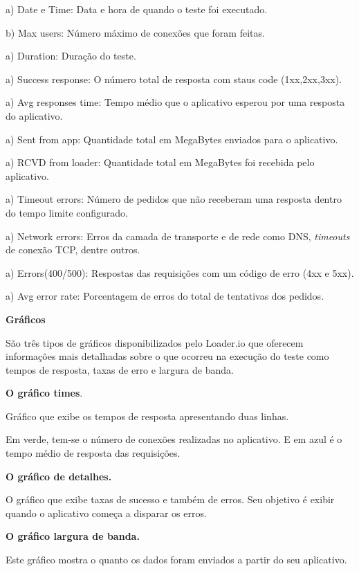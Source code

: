   \begin{compactitem}
    \item[a)] Date e Time: Data e hora de quando o teste foi executado.
    \item[b)] Max users: Número máximo de conexões que foram feitas.
    \item[a)] Duration:  Duração do teste.
    \item[a)] Success response: O número total de resposta com staus code (1xx,2xx,3xx).
    \item[a)] Avg responses time: Tempo médio que o aplicativo esperou por uma resposta do aplicativo.
    \item[a)] Sent from app: Quantidade total em MegaBytes enviados para o aplicativo.
    \item[a)] RCVD from loader: Quantidade total em MegaBytes foi recebida pelo aplicativo.
    \item[a)] Timeout errors: Número de pedidos que não receberam uma resposta dentro do tempo limite configurado.
    \item[a)] Network errors: Erros da camada de transporte e de rede como \ac{DNS}, \textit{timeouts} de conexão TCP, dentre outros.
    \item[a)] Errors(400/500): Respostas das requisições com um código de erro (4xx e 5xx).
    \item[a)] Avg error rate: Porcentagem de erros do total de tentativas dos pedidos.
  \end{compactitem}

  \textbf{Gráficos}
  
  São três tipos de gráficos disponibilizados pelo Loader.io que oferecem informações mais detalhadas 
  sobre o que ocorreu na execução do teste como tempos de resposta, taxas de erro e largura de banda.
  
  \textbf{O gráfico times}.
  
  Gráfico que exibe os tempos de resposta apresentando duas linhas.
  
  Em verde, tem-se o número de conexões realizadas no aplicativo. E em azul é o tempo médio de resposta das
  requisições.
  
  \textbf{O gráfico de detalhes.}
  
  O gráfico que exibe taxas de sucesso e também de erros. Seu objetivo é exibir quando o aplicativo
  começa a disparar os erros.
  
  \textbf{O gráfico largura de banda.}
  
  Este gráfico mostra o quanto os dados foram enviados a partir do seu aplicativo.



